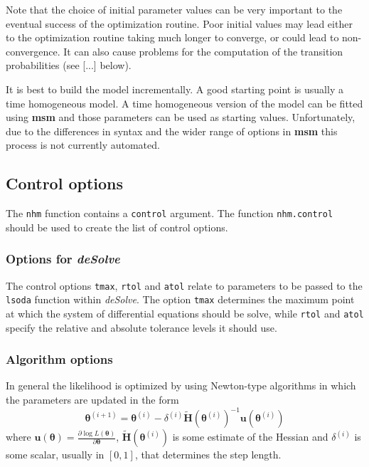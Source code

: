 \documentclass{article}
\numberwithin{equation}{section}
\begin{document}
Note that the choice of initial parameter values can be very important to the eventual success of the optimization routine. Poor initial values may lead either to the optimization routine taking much longer to converge, or could lead to non-convergence. It can also cause problems for the computation of the transition probabilities (see [...] below).

It is best to build the model incrementally. A good starting point is usually a time homogeneous model. A time homogeneous version of the model can be fitted using {\bf msm} and those parameters can be used as starting values. Unfortunately, due to the differences in syntax and the wider range of options in {\bf msm} this process is not currently automated.


\subsection{Control options}

The \verb!nhm! function contains a \verb!control! argument. The function \verb!nhm.control! should be used to create the list of control options.

\subsubsection{Options for \it{deSolve}}

The control options \verb!tmax!, \verb!rtol!  and \verb!atol! relate to parameters to be passed to the \verb!lsoda! function within {\it deSolve}. The option \verb!tmax! determines the maximum point at which the system of differential equations should be solve, while \verb!rtol! and \verb!atol! specify the relative and absolute tolerance levels it should use.

\subsubsection{Algorithm options}
\label{alg_sec}

In general the likelihood is optimized by using Newton-type algorithms in which the parameters are updated in the form
$$\bm\theta^{(i+1)} = \bm\theta^{(i)} - \delta^{(i)} \mathbf{\tilde{H}}(\bm\theta^{(i)})^{-1}\mathbf{u}(\bm\theta^{(i)})$$ 
where $\mathbf{u}(\bm\theta) = \frac{\partial \log L(\bm\theta)}{\partial \bm\theta}$, $\mathbf{\tilde{H}}(\bm\theta^{(i)})$ is some estimate of the Hessian and $\delta^{(i)}$ is some scalar, usually in $[0,1]$, that determines the step length.
\end{document}

